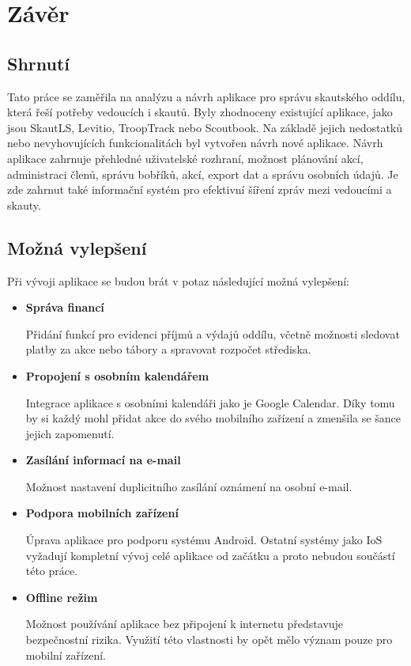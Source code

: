 \documentclass[twoside]{ctuthesis}
\begin{document}
\chapter{Závěr}
\section{Shrnutí}
Tato práce se zaměřila na analýzu a návrh aplikace pro správu skautského oddílu, která řeší potřeby vedoucích i skautů. Byly zhodnoceny existující aplikace, jako jsou SkautLS, Levitio, TroopTrack nebo Scoutbook. Na základě jejich nedostatků nebo nevyhovujících funkcionalitách byl vytvořen návrh nové aplikace. Návrh aplikace zahrnuje přehledné uživatelské rozhraní, možnost plánování akcí, administraci členů, správu bobříků, akcí, export dat a správu osobních údajů. Je zde zahrnut také informační systém pro efektivní šíření zpráv mezi vedoucími a skauty.


\section{Možná vylepšení}
Při vývoji aplikace se budou brát v potaz následující možná vylepšení:

\begin{itemize}
\item \textbf{Správa financí}

Přidání funkcí pro evidenci příjmů a výdajů oddílu, včetně možnosti sledovat platby za akce nebo tábory a spravovat rozpočet střediska.
\item \textbf{Propojení s osobním kalendářem}

Integrace aplikace s osobními kalendáři jako je Google Calendar. Díky tomu by si každý mohl přidat akce do svého mobilního zařízení a zmenšila se šance jejich zapomenutí.
\item \textbf{Zasílání informací na e-mail}

Možnost nastavení duplicitního zasílání oznámení na osobní e-mail.
\item \textbf{Podpora mobilních zařízení}

Úprava aplikace pro podporu systému Android. Ostatní systémy jako IoS vyžadují kompletní vývoj celé aplikace od začátku a proto nebudou součástí této práce.
\item \textbf{Offline režim}

Možnost používání aplikace bez připojení k internetu představuje bezpečnostní rizika. Využití této vlastnosti by opět mělo význam pouze pro mobilní zařízení.
\end{itemize}
\end{document}
